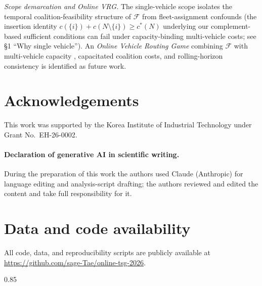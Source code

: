 \documentclass[11pt]{article}
\theoremstyle{plain}
\theoremstyle{definition}
\theoremstyle{remark}
\newcommand{\F}{\mathcal{F}}
\newcommand{\cstar}{c^{\ast}}
\begin{document}
\emph{Scope demarcation and Online VRG.} The single-vehicle scope isolates the temporal coalition-feasibility structure of $\F$ from fleet-assignment confounds (the insertion identity $c(\{i\})+c(N\setminus\{i\})\ge\cstar(N)$ underlying our complement-based sufficient conditions can fail under capacity-binding multi-vehicle costs; see §1 ``Why single vehicle''). An \emph{Online Vehicle Routing Game} combining $\F$ with multi-vehicle capacity \citep{gothe1996vrg,engevall2004heterogeneous}, capacitated coalition costs, and rolling-horizon consistency \citep{lehrer2013dynamic,kimms2016rolling} is identified as future work.

\section*{Acknowledgements}
This work was supported by the Korea Institute of Industrial Technology under Grant No.~EH-26-0002.

\paragraph*{Declaration of generative AI in scientific writing.} During the preparation of this work the authors used Claude (Anthropic) for language editing and analysis-script drafting; the authors reviewed and edited the content and take full responsibility for it.

\section*{Data and code availability}
All code, data, and reproducibility scripts are publicly available at \url{https://github.com/sage-Tae/online-tsg-2026}.

\renewcommand{\bibfont}{\footnotesize}
\setlength{\bibsep}{0pt plus 0.0ex minus 0.0ex}
\begin{spacing}{0.85}


\end{spacing}
\end{document}
